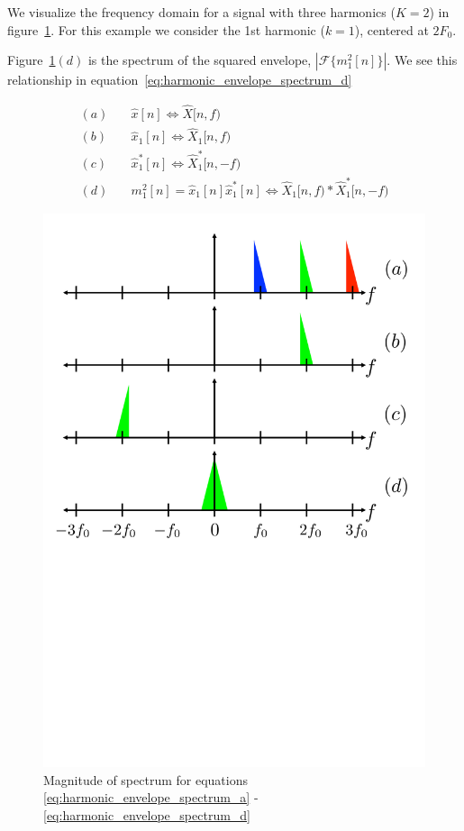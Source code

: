 \documentclass [11pt, proquest] {uwthesis}[2015/03/03]
\begin{document}
We visualize the frequency domain for a signal with three harmonics ($K = 2$) in figure~\ref{fig:harmonic_envelope}.  For this example we consider the 1st harmonic ($k = 1$), centered at $2F_0$.

Figure~\ref{fig:harmonic_envelope}$(d)$ is the spectrum of the squared envelope, $| \mathcal{F} \{m_1^2[n] \}|$.  We see this relationship in equation~\ref{eq:harmonic_envelope_spectrum_d}

\begin{align}
\label{eq:harmonic_envelope_spectrum_a}
(a)& \quad \widehat{x}[n] \Longleftrightarrow \widehat{X}[n,f)  \\
(b)& \quad \widehat{x}_1[n] \Longleftrightarrow \widehat{X}_1[n,f) \\
(c)& \quad \widehat{x}_1^*[n] \Longleftrightarrow \widehat{X}_1^*[n,-f) \\
\label{eq:harmonic_envelope_spectrum_d}
(d)& \quad m_1^2[n] = \widehat{x}_1[n] \widehat{x}_1^*[n] \Longleftrightarrow \widehat{X}_1[n,f) * \widehat{X}_1^*[n,-f)
\end{align}

\begin{figure}[!ht]
  \centering
    \includegraphics[width=.62\textwidth]{harmonic_envelope}
        \caption{Magnitude of spectrum for equations \ref{eq:harmonic_envelope_spectrum_a} - \ref{eq:harmonic_envelope_spectrum_d}}\label{fig:harmonic_envelope}
\end{figure}
\end{document}
